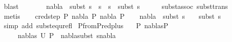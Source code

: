 \begin{isabellebody}
\ blast\ \isanewline
\ \ \isamarkupfalse%
\isanewline
\ \ \isamarkupfalse%
\ {\isachardoublequoteopen}nabla{}\ {\isasymTurnstile}\ subst\ {\isacharparenleft}{\kern0pt}s{}\ {\isasymbullet}\ {\isacharparenleft}{\kern0pt}s{}\ {\isasymbullet}\ s{\isacharparenright}{\kern0pt}{\isacharparenright}{\kern0pt}\ {\isasymapprox}\ subst\ s{}{\isachardoublequoteclose}\isanewline
\ \ \ \ \isamarkupfalse%
\ subst{\isacharunderscore}{\kern0pt}assoc\ subst{\isacharunderscore}{\kern0pt}trans\ \isamarkupfalse%
\ metis\isanewline
{}\isamarkupfalse%
\isanewline
\ \ \isamarkupfalse%
\ {\isacharparenleft}{\kern0pt}cred{\isacharunderscore}{\kern0pt}step\ P{}\ nabla{}\ P{}\ nabla{}\ P{}{\isacharparenright}{\kern0pt}\isanewline
\ \ \isamarkupfalse%
\ {\isachardoublequoteopen}nabla{}\ {\isasymTurnstile}\ subst\ {\isacharparenleft}{\kern0pt}s{}\ {\isasymbullet}\ {\isacharbrackleft}{\kern0pt}{\isacharbrackright}{\kern0pt}{\isacharparenright}{\kern0pt}\ {\isasymapprox}\ subst\ s{}{\isachardoublequoteclose}\isanewline
\ \ \ \ \isamarkupfalse%
\ {\isacharparenleft}{\kern0pt}simp\ add{\isacharcolon}{\kern0pt}\ subst{\isacharunderscore}{\kern0pt}equ{\isacharunderscore}{\kern0pt}refl{\isacharparenright}{\kern0pt}\isanewline
{}\isamarkupfalse%
%
\endisatagproof
{\isafoldproof}%
%
\isadelimproof
\isanewline
%
\endisadelimproof
\isanewline
{}\isamarkupfalse%
\ P{}{\isacharunderscore}{\kern0pt}from{\isacharunderscore}{\kern0pt}P{}{\isacharunderscore}{\kern0pt}red{\isacharunderscore}{\kern0pt}plus{\isacharcolon}{\kern0pt}\isanewline
\ \ \ {\isachardoublequoteopen}P{}\ {\isasymTurnstile}{\isacharparenleft}{\kern0pt}nabla{\isacharcomma}{\kern0pt}s{\isacharparenright}{\kern0pt}{\isasymRightarrow}P{}{\isachardoublequoteclose}\isanewline
\ \ \ \ \ {\isachardoublequoteopen}{\isacharparenleft}{\kern0pt}nabla{}{\isacharcomma}{\kern0pt}s{}{\isacharparenright}{\kern0pt}{\isasymin}\ U\ P{}{\isachardoublequoteclose}\ \ {\isachardoublequoteopen}nabla{}{\isasymTurnstile}{\isacharparenleft}{\kern0pt}subst\ s{}{\isacharparenright}{\kern0pt}{\isacharparenleft}{\kern0pt}nabla{\isacharparenright}{\kern0pt}{\isachardoublequoteclose}\isanewline

\end{isabellebody}
